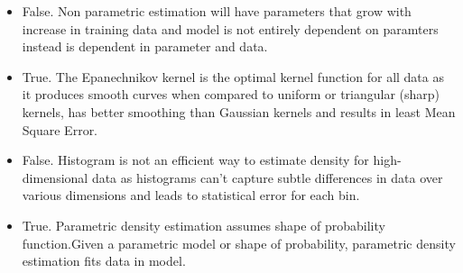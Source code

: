 \documentclass{article}
\begin{document}
\begin{itemize}
    \item False. Non parametric estimation will have parameters that grow with increase in training data and model is not entirely dependent on paramters instead is dependent in parameter and data.
    \item True. The Epanechnikov kernel is the optimal kernel function for all data as it produces smooth curves when compared to uniform or triangular (sharp) kernels, has better smoothing than Gaussian kernels and results in least Mean Square Error.
    \item False. Histogram is not an efficient way to estimate density for high-dimensional data as histograms can't capture subtle differences in data over various dimensions and leads to statistical error for each bin.
    \item True. Parametric density estimation assumes shape of probability function.Given a parametric model or shape of probability, parametric density estimation fits data in model. 
\end{itemize}
\end{document}
